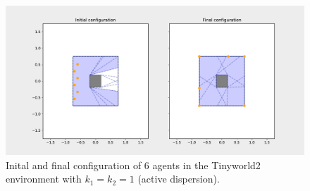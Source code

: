 \begin{figure}[H]
  \centering
  \includegraphics[width=\textwidth]{figs/tinyworld2_6_agnt_k_1_1_k_2_1_distr.pdf}
  \caption{Inital and final configuration of 6 agents in the Tinyworld2 environment with $k_{1} = k_{2} = 1$ (active dispersion).}
  \label{fig:6_agnt_tw2_k_1_1_k_2_1_distr}
\end{figure}
